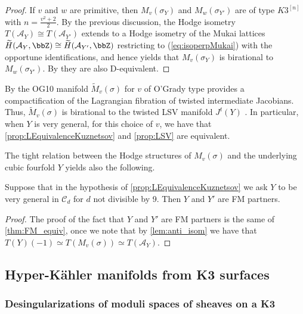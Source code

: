\documentclass{amsart}
\begin{document}
\begin{proof}
    If $v$ and $w$ are primitive, then \(M_v(\sigma_Y)\) and \(M_w(\sigma_{Y'})\) are of type $K3^{[n]}$ with \(n=\frac{v^2+2}{2}\). By the previous discussion, the Hodge isometry \(T(\mathcal{A}_Y)\cong T(\mathcal{A}_{Y'})\) extends to a Hodge isometry of the Mukai lattices \(\widetilde{H}(\mathcal{A}_Y,\bbZ)\cong \widetilde{H}(\mathcal{A}_{Y'},\bbZ)\) restricting to (\ref{eq:isoperpMukai}) with the opportune identifications, and hence \cite[Corollary 9.9]{markman2011survey} yields that \(M_v(\sigma_Y)\) is birational to \(M_w(\sigma_{Y'})\). By \cite[Theorem 1.2]{maulik2025d} they are also D-equivalent.
\end{proof}
\begin{remark}
    By \cite[Proposition 6.7]{LPZ_OG10} the OG10 manifold $\widetilde{M}_v(\sigma)$ for $v$ of O'Grady type provides a compactification of the Lagrangian fibration of twisted intermediate Jacobians. Thus, $\widetilde{M}_v(\sigma)$ is birational to the twisted LSV manifold $J^t(Y)$ \cite{voisin2016hyper}. In particular, when \(Y\) is very general, for this choice of $v$, we have that \autoref{prop:LEquivalenceKuznetsov} and \autoref{prop:LSV} are equivalent. 
\end{remark}
The tight relation between the Hodge structures of $M_v(\sigma)$ and the underlying cubic fourfold $Y$ yields also the following.
\begin{corollary}\label{cor:Kuz_special_cubics}
     Suppose that in the hypothesis of \autoref{prop:LEquivalenceKuznetsov} we ask $Y$ to be very general in $\mathcal{C}_d$ for $d$ not divisible by 9. Then \(Y\) and \(Y'\) are FM partners.
\end{corollary}
\begin{proof}
    The proof of the fact that \(Y\) and \(Y'\) are FM partners is the same of \autoref{thm:FM_equiv}, once we note that by \autoref{lem:anti_isom} we have that $T(Y)(-1)\simeq T(M_v(\sigma))\simeq T(\mathcal{A}_Y)$.
\end{proof}









\subsection{Hyper-Kähler manifolds from K3 surfaces}

\subsubsection{Desingularizations of moduli spaces of sheaves on a K3}
\end{document}
